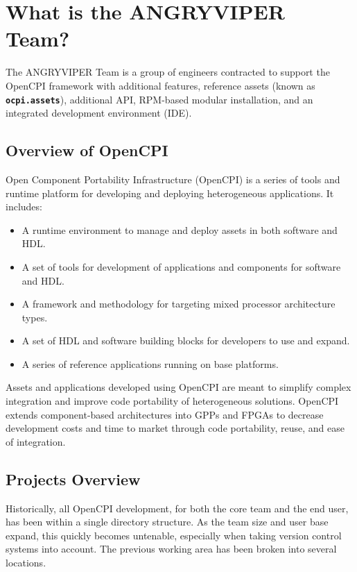 \newpage
\section{What is the ANGRYVIPER Team?}
\label{sec:what_is_angryviper}
The ANGRYVIPER Team is a group of engineers contracted to support the OpenCPI framework with additional features, reference assets (known as \textbf{\texttt{ocpi.assets}}), additional API, RPM-based modular installation, and an integrated development environment (IDE).

\subsection{Overview of OpenCPI}
Open Component Portability Infrastructure (OpenCPI) is a series of tools and runtime platform for developing and deploying heterogeneous applications. It includes:
\begin{itemize}
\item A runtime environment to manage and deploy assets in both software and HDL.
\item A set of tools for development of applications and components for software and HDL.
\item A framework and methodology for targeting mixed processor architecture types.
\item A set of HDL and software building blocks for developers to use and expand.
\item A series of reference applications running on base platforms.
\end{itemize}

Assets and applications developed using OpenCPI are meant to simplify complex integration and improve code portability of heterogeneous solutions. OpenCPI extends component-based architectures into GPPs and FPGAs to decrease development costs and time to market through code portability, reuse, and ease of integration.

\subsection{Projects Overview}
Historically, all OpenCPI development, for both the core team and the end user, has been within a single directory structure. As the team size and user base expand, this quickly becomes untenable, especially when taking version control systems into account. The previous working area has been broken into several locations. \\

